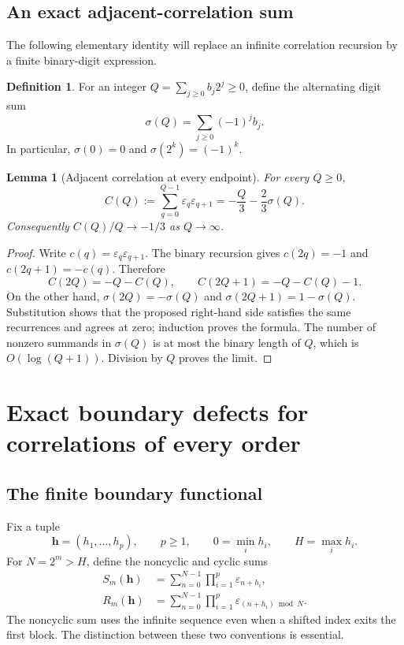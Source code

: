 \documentclass[11pt,oneside]{article}
\numberwithin{equation}{section}
\newtheorem{lemma}[theorem]{Lemma}
\theoremstyle{definition}
\newtheorem{definition}[theorem]{Definition}
\theoremstyle{remark}
\newcommand{\eps}{\varepsilon}
\begin{document}
\subsection{An exact adjacent-correlation sum}
The following elementary identity will replace an infinite correlation
recursion by a finite binary-digit expression.

\begin{definition}
For an integer \(Q=\sum_{j\ge0}b_j2^j\ge0\), define the alternating digit sum
\begin{equation}
 \sigma(Q)=\sum_{j\ge0}(-1)^jb_j.
 \label{eq:sigma}
\end{equation}
In particular, \(\sigma(0)=0\) and \(\sigma(2^k)=(-1)^k\).
\end{definition}

\begin{lemma}[Adjacent correlation at every endpoint]
For every \(Q\ge0\),
\begin{equation}
 C(Q):=\sum_{q=0}^{Q-1}\eps_q\eps_{q+1}
       =-\frac Q3-\frac23\sigma(Q).
 \label{eq:C}
\end{equation}
Consequently \(C(Q)/Q\to-1/3\) as \(Q\to\infty\).
\end{lemma}
\begin{proof}
Write \(c(q)=\eps_q\eps_{q+1}\). The binary recursion gives
\(c(2q)=-1\) and \(c(2q+1)=-c(q)\). Therefore
\[
 C(2Q)=-Q-C(Q),\qquad C(2Q+1)=-Q-C(Q)-1.
\]
On the other hand,
\(\sigma(2Q)=-\sigma(Q)\) and
\(\sigma(2Q+1)=1-\sigma(Q)\). Substitution shows that the proposed right-hand
side satisfies the same recurrences and agrees at zero; induction proves the
formula. The number of nonzero summands in \(\sigma(Q)\) is at most the binary
length of \(Q\), which is \(O(\log(Q+1))\). Division by \(Q\) proves the limit.
\end{proof}

\section{Exact boundary defects for correlations of every order}
\label{sec:correlations}

\subsection{The finite boundary functional}
Fix a tuple
\[
 \bm h=(h_1,\ldots,h_p),\qquad p\ge1,\qquad
 0=\min_i h_i,\qquad H=\max_i h_i.
\]
For \(N=2^m>H\), define the noncyclic and cyclic sums
\begin{align}
 S_m(\bm h)&=\sum_{n=0}^{N-1}\prod_{i=1}^p\eps_{n+h_i},
 \label{eq:Sm}\\
 R_m(\bm h)&=\sum_{n=0}^{N-1}\prod_{i=1}^p
                 \eps_{(n+h_i)\bmod N}.
 \label{eq:Rm}
\end{align}
The noncyclic sum uses the infinite sequence even when a shifted index exits
the first block. The distinction between these two conventions is essential.
\end{document}
